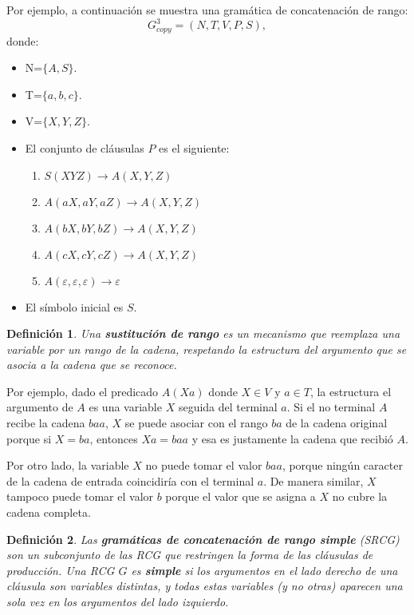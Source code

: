 \documentclass[12pt]{article}
\newtheorem{definition}{Definición}
\begin{document}
Por ejemplo, a continuación se muestra una gramática de concatenación de rango:
\label{g_3copy}
\[
    G^3_{copy} = (N, T, V, P, S),
\]
donde:

\begin{itemize}
    \item  N=$\{A,S\}$.
    \item T=$\{a,b,c\}$.
    \item V=$\{X,Y,Z\}$.
    \item El conjunto de cláusulas $P$ es el siguiente:
          \begin{enumerate}
              \item $S(XYZ)\to A(X,Y,Z)$
              \item $A(aX,aY,aZ)\to A(X,Y,Z)$
              \item $A(bX,bY,bZ)\to A(X,Y,Z)$
              \item $A(cX,cY,cZ)\to A(X,Y,Z)$
              \item $A(\varepsilon,\varepsilon,\varepsilon)\to \varepsilon$
          \end{enumerate}
    \item El símbolo inicial es $S$.
\end{itemize}

\begin{definition}
    Una \textbf{sustitución de rango} es un mecanismo que reemplaza una variable por un 
    rango de la cadena, respetando la estructura del argumento que se asocia a la cadena que se reconoce. 
\end{definition}

Por ejemplo, dado el predicado $A(Xa)$ donde $X \in V$ y $a \in T$, la estructura el argumento de $A$ es una 
variable $X$ seguida del terminal $a$. Si el no terminal $A$ recibe la cadena $baa$, $X$ se puede asociar 
con el rango $ba$ de la cadena original porque si $X=ba$, entonces  $Xa=baa$ y esa es justamente la cadena 
que recibió $A$.

Por otro lado, la variable $X$ no puede tomar el valor $baa$, porque ningún caracter de la cadena de entrada coincidiría con el terminal $a$. De manera similar, $X$ tampoco puede tomar el valor $b$ porque el valor que se asigna a $X$ no cubre la cadena completa.

\begin{definition}
    Las \textbf{gramáticas de concatenación de rango simple}
    (\textit{SRCG}) son un subconjunto de las RCG que restringen la forma de las cláusulas de producción.  
    Una RCG $G$ es \textbf{simple} si los argumentos en el lado derecho de una cláusula son variables distintas, 
    y todas estas variables (y no otras) aparecen una sola vez en los argumentos del lado izquierdo.  
\end{definition}
\end{document}
